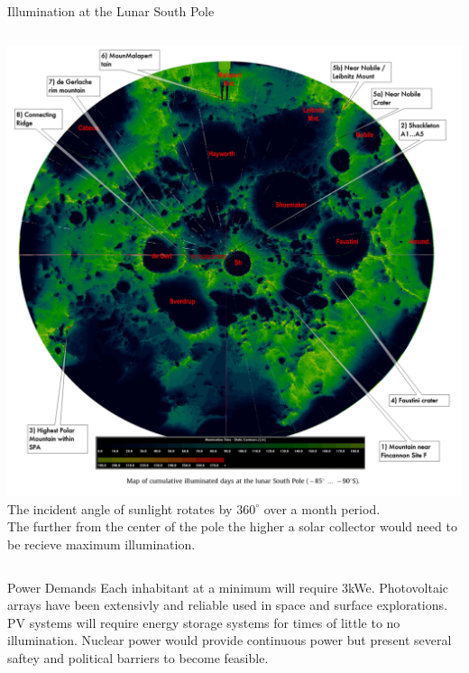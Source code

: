 \documentclass{beamer}
\begin{document}
\begin{frame}{Illumination at the Lunar South Pole}
       \begin{columns}
             \centering
             \includegraphics[width= \textwidth]{South_Pole_Light.jpg}
            The incident angle of sunlight rotates by $360^{\circ}$ over a month period.\\
            The further from the center of the pole the higher a solar collector would need to be recieve maximum illumination.  \cite{Koebel}
         \end{columns} 
    \end{frame}


\begin{frame}{Power Demands}
Each inhabitant at a minimum will require 3kWe. Photovoltaic arrays have been extensivly and reliable used in space and surface explorations. PV systems will require energy storage systems for times of little to no illumination. Nuclear power would provide continuous power but present several saftey and political barriers to become feasible\cite{Hickman}.
\end{frame}
\end{document}
